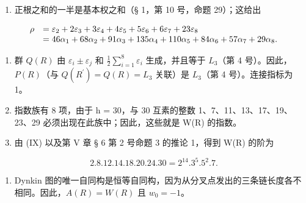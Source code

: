 \begin{enumerate}
\def\labelenumi{(\Roman{enumi})}
\setcounter{enumi}{6}
\tightlist
\item
  正根之和的一半是基本权之和（§ 1，第 10 号，命题 29）；这给出
\end{enumerate}

\[
\begin{array}{r l} \rho & = \varepsilon_ {2} + 2 \varepsilon_ {3} + 3 \varepsilon_ {4} + 4 \varepsilon_ {5} + 5 \varepsilon_ {6} + 6 \varepsilon_ {7} + 23 \varepsilon_ {8} \\ & = 46 \alpha_ {1} + 68 \alpha_ {2} + 91 \alpha_ {3} + 135 \alpha_ {4} + 110 \alpha_ {5} + 84 \alpha_ {6} + 57 \alpha_ {7} + 29 \alpha_ {8}. \end{array}
\]

\begin{enumerate}
\def\labelenumi{(\Roman{enumi})}
\setcounter{enumi}{7}
\item
  群 \(Q(R)\) 由 \(\varepsilon_{i} \pm \varepsilon_{j}\) 和 \(\frac{1}{2} \sum_{i=1}^{8} \varepsilon_{i}\) 生成，并且等于 \(L_{3}\)（第 4 号）。因此，\(P(R)\)（与 \(Q(R^{\prime}) = Q(R) = L_{3}\) 关联）是 \(L_{3}\)（第 4 号）。连接指标为 1。
\item
  指数族有 8 项，由于 h = 30，与 30 互素的整数 1、7、11、13、17、19、23、29 必须出现在此族中；因此，这些就是 W(R) 的指数。
\item
  由 (IX) 以及第 V 章 § 6 第 2 号命题 3 的推论 1，得到 W(R) 的阶为
\end{enumerate}

\[
2. 8. 12. 14. 18. 20. 24. 30 = 2 ^ {14}. 3 ^ {5}. 5 ^ {2}. 7.
\]

\begin{enumerate}
\def\labelenumi{(\Roman{enumi})}
\setcounter{enumi}{10}
\tightlist
\item
  Dynkin 图的唯一自同构是恒等自同构，因为从分叉点发出的三条链长度各不相同。因此，\(A(R) = W(R)\) 且 \(w_{0} = -1\)。
\end{enumerate}

